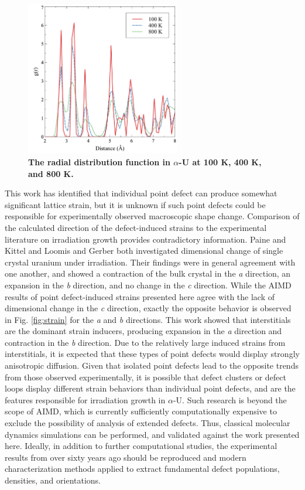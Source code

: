 \documentclass[utf8]{frontiersSCNS} %
\providecommand{\DIFaddtex}[1]{{\bf #1}} %
\providecommand{\DIFaddbegin}{\protect\color{blue}} %
\providecommand{\DIFaddend}{\protect\color{black}} %
\providecommand{\DIFaddFL}[1]{\DIFadd{#1}} %
\providecommand{\DIFadd}[1]{\texorpdfstring{\DIFaddtex{#1}}{#1}} %
\begin{document}
 \DIFaddbegin \begin{figure}[hbt]
	\centering
	\includegraphics[width=0.6\textwidth]{rdfs.jpg}
    \caption{\DIFaddFL{The radial distribution function in $\alpha$-U at 100 K, 400 K, and 800 K. }}\label{fig:rdf}
\end{figure}

\DIFaddend This work has identified that individual point defect can produce somewhat significant lattice strain, but it is unknown if such point defects could be responsible for experimentally observed macroscopic shape change. Comparison of the calculated direction of the defect-induced strains to the experimental literature on irradiation growth provides contradictory information. Paine and Kittel \cite{paine1958} and Loomis and Gerber \cite{loomis1968} both investigated dimensional change of single crystal uranium under irradiation. Their findings were in general agreement with one another, and showed a contraction of the bulk crystal in the \textit{a} direction, an expansion in the \textit{b} direction, and no change in the \textit{c} direction. While the AIMD results of point defect-induced strains presented here agree with the lack of dimensional change in the \textit{c} direction, exactly the opposite behavior is observed in Fig. \ref{fig:strain} for the \textit{a} and \textit{b} directions. This work showed that interstitials are the dominant strain inducers, producing expansion in the \textit{a} direction and contraction in the \textit{b} direction. Due to the relatively large induced strains from interstitials, it is expected that these types of point defects would display strongly anisotropic diffusion. Given that isolated point defects lead to the opposite trends from those observed experimentally, it is possible that defect clusters or defect loops display different strain behaviors than individual point defects, and are the features responsible for irradiation growth in $\alpha$-U. Such research is beyond the scope of AIMD, which is currently sufficiently computationally expensive to exclude the possibility of analysis of extended defects. Thus, classical molecular dynamics simulations can be performed, and validated against the work presented here. Ideally, in addition to further computational studies, the experimental results from over sixty years ago should be reproduced and modern characterization methods applied to extract fundamental defect populations, densities, and orientations. 
\end{document}
